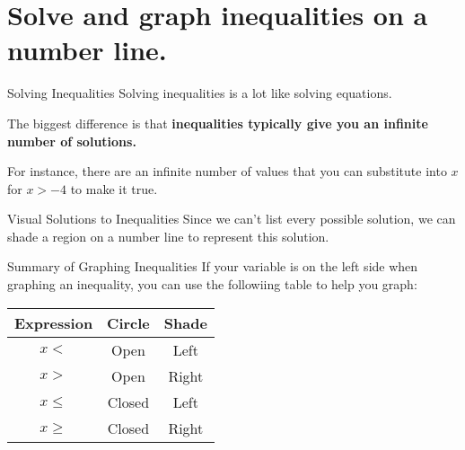 \documentclass[t]{beamer}
\begin{document}
\section{Solve and graph inequalities on a number line.}


\begin{frame}{Solving Inequalities}
Solving inequalities is a lot like solving equations.	\newline\\	\pause

The biggest difference is that {\color{blue}\textbf{inequalities typically give you an infinite number of solutions.}}	\newline\\	\pause

For instance, there are an infinite number of values that you can substitute into $x$ for $x > -4$ to make it true.
\end{frame}

\begin{frame}{Visual Solutions to Inequalities}
Since we can't list every possible solution, we can shade a region on a number line to represent this solution.	\newline\\	\pause
\begin{center}
\end{center}
\end{frame}

\begin{frame}{Summary of Graphing Inequalities}
If your variable is on the \alert{left side} when graphing an inequality, you can use the followiing table to help you graph:	\newline\\
\begin{center}
\setlength{\extrarowheight}{4pt}
\begin{tabular}{c|c|c}  
\textbf{Expression}	&	\textbf{Circle}	&	\textbf{Shade}	\\
\hline
$x<$					&	Open				& 	Left		\\[4pt]
\hline
$x>$					&	Open				&	Right	\\[4pt]
\hline
$x \leq$				&	Closed			&	Left		\\[4pt]
\hline
$x \geq$				&	Closed			&	Right	\\[4pt]
\end{tabular}
\end{center}
\end{frame}
\end{document}
